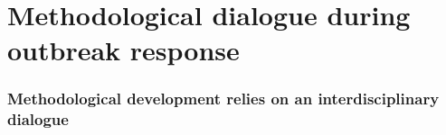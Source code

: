\documentclass[xcolor=svgnames,mathserif]{beamer}
\begin{document}







\section[Methodological dialogue]{Methodological dialogue during outbreak response}


\begin{frame}[fragile]
  \frametitle{Methodological development relies on an interdisciplinary dialogue}
  
  \begin{center} 


\end{center}
\end{frame}
\end{document}
